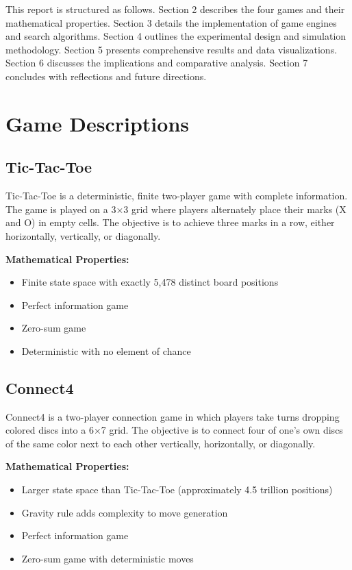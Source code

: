 \documentclass[12pt]{article}
\begin{document}
This report is structured as follows. Section 2 describes the four games and their mathematical properties. Section 3 details the implementation of game engines and search algorithms. Section 4 outlines the experimental design and simulation methodology. Section 5 presents comprehensive results and data visualizations. Section 6 discusses the implications and comparative analysis. Section 7 concludes with reflections and future directions.

\section{Game Descriptions}

\subsection{Tic-Tac-Toe}

Tic-Tac-Toe is a deterministic, finite two-player game with complete information. The game is played on a 3×3 grid where players alternately place their marks (X and O) in empty cells. The objective is to achieve three marks in a row, either horizontally, vertically, or diagonally.

\textbf{Mathematical Properties:}
\begin{itemize}
    \item Finite state space with exactly 5,478 distinct board positions
    \item Perfect information game
    \item Zero-sum game
    \item Deterministic with no element of chance
\end{itemize}

\subsection{Connect4}

Connect4 is a two-player connection game in which players take turns dropping colored discs into a 6×7 grid. The objective is to connect four of one's own discs of the same color next to each other vertically, horizontally, or diagonally.

\textbf{Mathematical Properties:}
\begin{itemize}
    \item Larger state space than Tic-Tac-Toe (approximately 4.5 trillion positions)
    \item Gravity rule adds complexity to move generation
    \item Perfect information game
    \item Zero-sum game with deterministic moves
\end{itemize}
\end{document}
